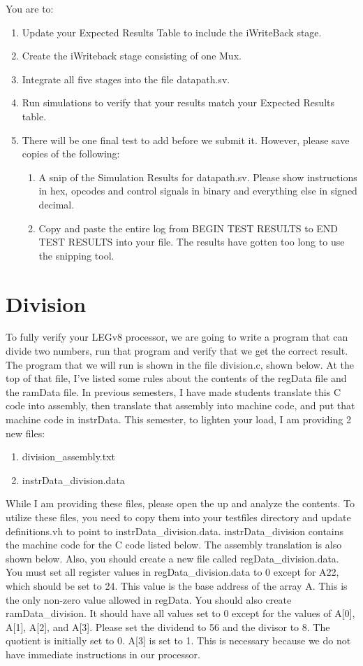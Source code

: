 You are to:
\begin{enumerate}
\item Update your Expected Results Table to include the iWriteBack stage.
\item Create the iWriteback stage consisting of one Mux.
\item Integrate all five stages into the file datapath.sv.
\item Run simulations to verify that your results match your Expected Results table.   
\item There will be one final test to add before we submit it.  However, please save copies of the following:
\begin{enumerate}
	\item A snip of the Simulation Results for datapath.sv.  Please show instructions in hex, opcodes and control signals in binary and everything else in signed decimal.  
	\item Copy and paste the entire log from BEGIN TEST RESULTS to END TEST RESULTS into your file.  The results have gotten too long to use the snipping tool.
\end{enumerate} 
\end{enumerate} 

\section{Division}
To fully verify your LEGv8 processor, we are going to write a program that can divide two numbers, run that program and verify that we get the correct result.  The program that we will run is shown in the file division.c, shown below.  At the top of that file, I've listed some rules about the contents of the regData file and the ramData file.  In previous semesters, I have made students translate this C code into assembly, then translate that assembly into machine code, and put that machine code in instrData.  This semester, to lighten your load, I am providing 2 new files:
\begin{enumerate}
	\item division\_assembly.txt
	\item instrData\_division.data
\end{enumerate}

While I am providing these files, please open the up and analyze the contents.  To utilize these files, you need to copy them into your testfiles directory and update definitions.vh to point to instrData\_division.data.  instrData\_division contains the machine code for the C code listed below.  The assembly translation is also shown below.  Also, you should create a new file called regData\_division.data. You must set all register values in regData\_division.data to 0 except for A22, which should be set to 24.  This value is the base address of the array A.  This is the only non-zero value allowed in regData.  You should also create ramData\_division.  It should have all values set to 0 except for the values of A[0], A[1], A[2], and A[3].  Please set the dividend to 56 and the divisor to 8.  The quotient is initially set to 0.  A[3] is set to 1.  This is necessary because we do not have immediate instructions in our processor.

